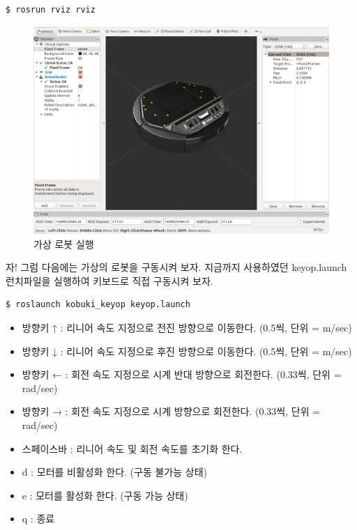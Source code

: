 \vspace{\baselineskip}
\begin{lstlisting}[language=ROS]
$ rosrun rviz rviz
\end{lstlisting}

\begin{figure}[h]
\centering\includegraphics[width=0.9\columnwidth]{pictures/chapter10/rviz_kobuki.png}
\caption{가상 로봇 실행}
\end{figure}

\noindent
자! 그럼 다음에는 가상의 로봇을 구동시켜 보자. 지금까지 사용하였던 keyop.launch 런치파일을 실행하여 키보드로 직접 구동시켜 보자. 

\vspace{\baselineskip}
\begin{lstlisting}[language=ROS]
$ roslaunch kobuki_keyop keyop.launch
\end{lstlisting}

\begin{itemize}[leftmargin=*]
\item 방향키 ↑ : 리니어 속도 지정으로 전진 방향으로 이동한다. (0.5씩, 단위 = m/sec) 
\item 방향키 ↓ : 리니어 속도 지정으로 후진 방향으로 이동한다. (0.5씩, 단위 = m/sec) 
\item 방향키 ← : 회전 속도 지정으로 시계 반대 방향으로 회전한다. (0.33씩, 단위 = rad/sec) 
\item 방향키 → : 회전 속도 지정으로 시계 방향으로 회전한다. (0.33씩, 단위 = rad/sec) 
\item 스페이스바 : 리니어 속도 및 회전 속도를 초기화 한다.
\item d : 모터를 비활성화 한다. (구동 불가능 상태)
\item e : 모터를 활성화 한다. (구동 가능 상태)
\item q : 종료
\end{itemize}

